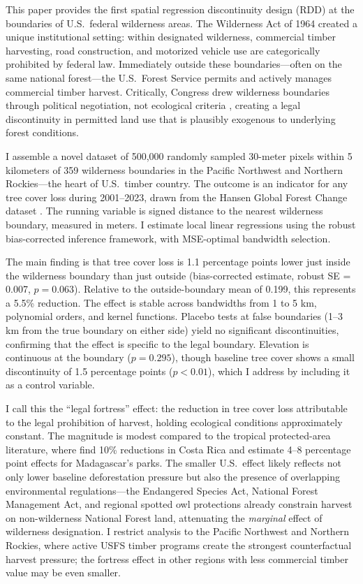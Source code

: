 \documentclass[12pt]{article}
\begin{document}
This paper provides the first spatial regression discontinuity design (RDD) at the boundaries of U.S.\ federal wilderness areas. The Wilderness Act of 1964 created a unique institutional setting: within designated wilderness, commercial timber harvesting, road construction, and motorized vehicle use are categorically prohibited by federal law. Immediately outside these boundaries---often on the same national forest---the U.S.\ Forest Service permits and actively manages commercial timber harvest. Critically, Congress drew wilderness boundaries through political negotiation, not ecological criteria \citep{ScottSuffrinfenAndAgrawal2001}, creating a legal discontinuity in permitted land use that is plausibly exogenous to underlying forest conditions.

I assemble a novel dataset of 500,000 randomly sampled 30-meter pixels within 5 kilometers of 359 wilderness boundaries in the Pacific Northwest and Northern Rockies---the heart of U.S.\ timber country. The outcome is an indicator for any tree cover loss during 2001--2023, drawn from the Hansen Global Forest Change dataset \citep{Hansen2013}. The running variable is signed distance to the nearest wilderness boundary, measured in meters. I estimate local linear regressions using the \citet{CattaneoEtAl2020} robust bias-corrected inference framework, with MSE-optimal bandwidth selection.

The main finding is that tree cover loss is 1.1 percentage points lower just inside the wilderness boundary than just outside (bias-corrected estimate, robust SE = 0.007, $p = 0.063$). Relative to the outside-boundary mean of 0.199, this represents a 5.5\% reduction. The effect is stable across bandwidths from 1 to 5 km, polynomial orders, and kernel functions. Placebo tests at false boundaries (1--3 km from the true boundary on either side) yield no significant discontinuities, confirming that the effect is specific to the legal boundary. Elevation is continuous at the boundary ($p = 0.295$), though baseline tree cover shows a small discontinuity of 1.5 percentage points ($p < 0.01$), which I address by including it as a control variable.

I call this the ``legal fortress'' effect: the reduction in tree cover loss attributable to the legal prohibition of harvest, holding ecological conditions approximately constant. The magnitude is modest compared to the tropical protected-area literature, where \citet{AnstadtAndPfaff2004} find 10\% reductions in Costa Rica and \citet{Ferraro2011} estimate 4--8 percentage point effects for Madagascar's parks. The smaller U.S.\ effect likely reflects not only lower baseline deforestation pressure but also the presence of overlapping environmental regulations---the Endangered Species Act, National Forest Management Act, and regional spotted owl protections already constrain harvest on non-wilderness National Forest land, attenuating the \emph{marginal} effect of wilderness designation. I restrict analysis to the Pacific Northwest and Northern Rockies, where active USFS timber programs create the strongest counterfactual harvest pressure; the fortress effect in other regions with less commercial timber value may be even smaller.
\end{document}
